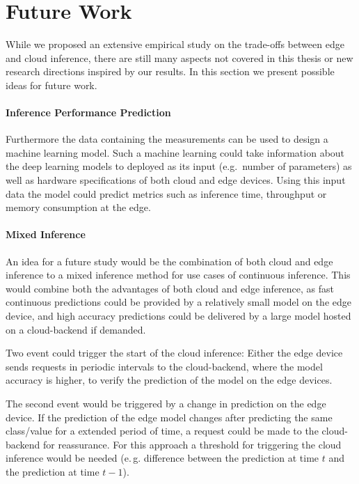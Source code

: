 \section{Future Work}
While we proposed an extensive empirical study on the trade-offs between edge and cloud inference, there are still many aspects not covered in this thesis or new research directions inspired by our results. 
In this section we present possible ideas for future work.
\paragraph{Inference Performance Prediction}
Furthermore the data containing the measurements can be used to design a machine learning model.
Such a machine learning could take information about the deep learning models to deployed as its input (e.g.\, number of parameters) as well as hardware specifications of both cloud and edge devices.
Using this input data the model could predict metrics such as inference time, throughput or memory consumption at the edge.
\paragraph{Mixed Inference}
An idea for a future study would be the combination of both cloud and edge inference to a mixed inference method for use cases of continuous inference.
This would combine both the advantages of both cloud and edge inference, as fast continuous predictions could be provided by a relatively small model on the edge device, and high accuracy predictions could be delivered by a large model hosted on a cloud-backend if demanded. 

Two event could trigger the start of the cloud inference: 
Either the edge device sends requests in periodic intervals to the cloud-backend, where the model accuracy is higher, to verify the prediction of the model on the edge devices.

The second event would be triggered by a change in prediction on the edge device. If the prediction of the edge model changes after predicting the same class/value for a extended period of time, a request could be made to the cloud-backend for reassurance. For this approach a threshold for triggering the cloud inference would be needed (e.\,g. difference between the prediction at time $t$ and the prediction at time $t-1$).



